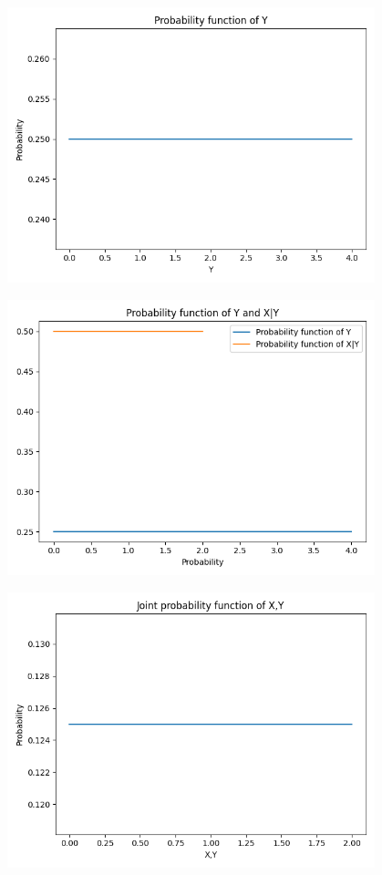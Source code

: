 \documentclass[a4paper,14pt]{article}
\begin{document}
\begin{center}
	\includegraphics[width=0.8\textwidth]{pic10.png}
\end{center}

\begin{center}
	\includegraphics[width=0.8\textwidth]{pic11.png}
\end{center}

\begin{center}
	\includegraphics[width=0.8\textwidth]{pic12.png}
\end{center}
\end{document}

